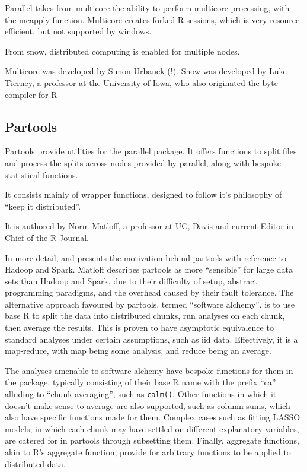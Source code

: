 \documentclass[10pt,a4paper]{article}
\begin{document}
Parallel takes from multicore the ability to perform multicore
processing, with the mcapply function. Multicore creates forked R
sessions, which is very resource-efficient, but not supported by
windows.

From snow, distributed computing is enabled for multiple nodes.

Multicore was developed by Simon Urbanek (!). Snow was developed by
Luke Tierney, a professor at the University of Iowa, who also
originated the byte-compiler for R

\subsection{Partools}
\label{sec:partools}

Partools provide utilities for the parallel
package\cite{matloff16:_softw_alchem}. It offers functions to split
files and process the splits across nodes provided by parallel, along
with bespoke statistical functions.

It consists mainly of wrapper functions, designed to follow it's
philosophy of ``keep it distributed''. 

It is authored by Norm Matloff, a professor at UC, Davis and current
Editor-in-Chief of the R Journal.

In more detail, \textcite{matloff15} and \textcite{matloff17} presents
the motivation behind partools with reference to Hadoop and Spark.
Matloff describes partools as more ``sensible'' for large data sets
than Hadoop and Spark, due to their difficulty of setup, abstract
programming paradigms, and the overhead caused by their fault
tolerance. The alternative approach favoured by partools, termed
``software alchemy'', is to use base R to split the data into
distributed chunks, run analyses on each chunk, then average the
results. This is proven to have asymptotic equivalence to standard
analyses under certain assumptions, such as iid data. Effectively, it
is a map-reduce, with map being some analysis, and reduce being an
average.

The analyses amenable to software alchemy have bespoke functions for
them in the package, typically consisting of their base R name with
the prefix ``ca'' alluding to ``chunk averaging'', such as
\texttt{calm()}. Other functions in which it doesn't make sense to
average are also supported, such as column sums, which also have
specific functions made for them. Complex cases such as fitting LASSO
models, in which each chunk may have settled on different explanatory
variables, are catered for in partools through subsetting them.
Finally, aggregate functions, akin to R's aggregate function, provide
for arbitrary functions to be applied to distributed data.
\end{document}
